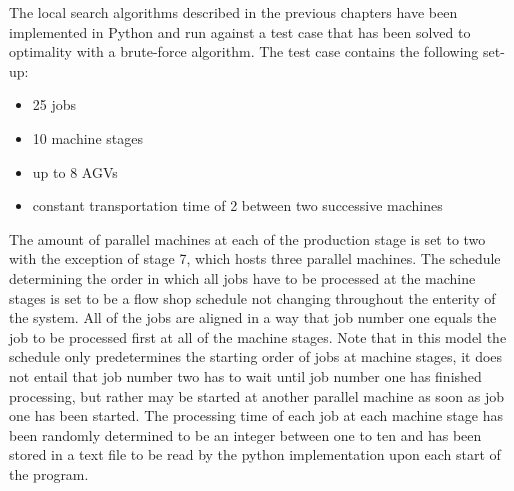 The local search algorithms described in the previous chapters have been implemented in Python and run against a test case that has been solved to optimality with a brute-force algorithm. The test case contains the following set-up:
\begin{itemize}
\item 25 jobs
\item 10 machine stages
\item up to 8 AGVs
\item constant transportation time of 2 between two successive machines
\end{itemize}
The amount of parallel machines at each of the production stage is set to two with the exception of stage 7, which hosts three parallel machines. The schedule determining the order in which all jobs have to be processed at the machine stages is set to be a flow shop schedule not changing throughout the enterity of the system. All of the jobs are aligned in a way that job number one equals the job to be processed first at all of the machine stages. Note that in this model the schedule only predetermines the starting order of jobs at machine stages, it does not entail that job number two has to wait until job number one has finished processing, but rather may be started at another parallel machine as soon as job one has been started. The processing time of each job at each machine stage has been randomly determined to be an integer between one to ten and has been stored in a text file to be read by the python implementation upon each start of the program.


